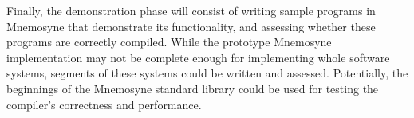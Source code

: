 \documentclass[11pt,a4paper]{article}
\theoremstyle{break}
\begin{document}
Finally, the demonstration phase will consist of writing sample programs in Mnemosyne that demonstrate its functionality, and assessing whether these programs are correctly compiled. While the prototype Mnemosyne implementation may not be complete enough for implementing whole software systems, segments of these systems could be written and assessed. Potentially, the beginnings of the Mnemosyne standard library could be used for testing the compiler's correctness and performance.
%
%
%
\end{document}
